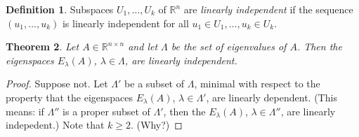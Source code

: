 \documentclass{amsart}
\newcommand{\RR}{\mathbb{R}}
\newtheorem{theorem}{Theorem}[section]
\theoremstyle{definition}
\newtheorem{definition}[theorem]{Definition}
\begin{document}
\begin{definition}
  Subspaces $U_1,\ldots,U_k$ of $\RR^n$ are \emph{linearly independent} if the sequence $(u_1,\ldots, u_k)$ is linearly independent for all $u_1\in U_1,\ldots,u_k\in U_k$. 
\end{definition}

\begin{theorem}
  Let $A\in\RR^{n\times n}$ and let $\Lambda$ be the set of eigenvalues of $A$.
  Then the eigenspaces $E_\lambda(A)$, $\lambda\in \Lambda$, are linearly independent.
  
\end{theorem}
\begin{proof}
  Suppose not.
  Let $\Lambda'$ be a subset of $\Lambda$, minimal with respect to the property that the eigenspaces $E_\lambda(A)$, $\lambda\in \Lambda'$, are linearly dependent.
  (This means: if $\Lambda''$ is a proper subset of $\Lambda'$, then the $E_\lambda(A)$, $\lambda\in \Lambda''$, are linearly indepedent.)
  Note that $k\geq 2$. (Why?)


\end{proof}
\end{document}
